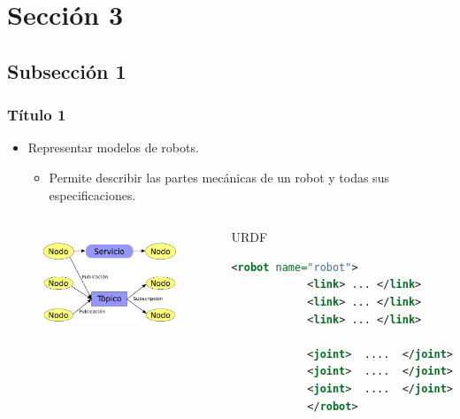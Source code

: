 \documentclass{beamer}
\begin{document}
\section{Sección 3}
\subsection{Subsección 1}
\begin{frame}[fragile]
	\frametitle{Título 1}
	\begin{itemize}
		\item Representar modelos de robots.
		\begin{itemize}
			\item Permite describir las partes mecánicas de un robot y todas sus especificaciones.
		\end{itemize}
	\end{itemize}
	
	\begin{columns}[c]
		\begin{figure}[htb]
			\centering
			\includegraphics[width = 01\linewidth]{imagenes/estructura_nodos.pdf}
			\label{Figura3_81}
		\end{figure}
		\begin{block}{URDF}		
			\begin{lstlisting}[language=XML]
			<robot name="robot">
			<link> ... </link>
			<link> ... </link>
			<link> ... </link>
			
			<joint>  ....  </joint>
			<joint>  ....  </joint>
			<joint>  ....  </joint>
			</robot>
			\end{lstlisting}
		\end{block}
	\end{columns}
	
\end{frame}
\end{document}
